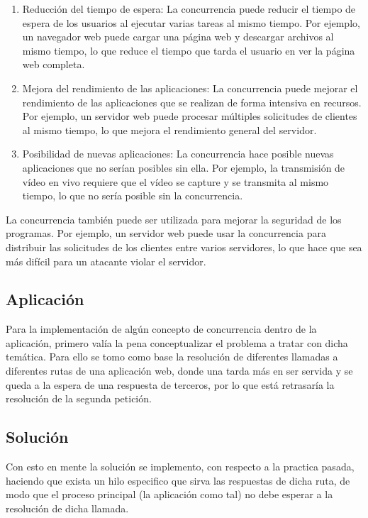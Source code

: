 \documentclass{dense_template}
\begin{document}
\begin{enumerate}
    \item Reducción del tiempo de espera: La concurrencia puede reducir el tiempo de espera de los usuarios al ejecutar varias tareas al mismo tiempo. Por ejemplo, un navegador web puede cargar una página web y descargar archivos al mismo tiempo, lo que reduce el tiempo que tarda el usuario en ver la página web completa.
    \item Mejora del rendimiento de las aplicaciones: La concurrencia puede mejorar el rendimiento de las aplicaciones que se realizan de forma intensiva en recursos. Por ejemplo, un servidor web puede procesar múltiples solicitudes de clientes al mismo tiempo, lo que mejora el rendimiento general del servidor.
    \item Posibilidad de nuevas aplicaciones: La concurrencia hace posible nuevas aplicaciones que no serían posibles sin ella. Por ejemplo, la transmisión de vídeo en vivo requiere que el vídeo se capture y se transmita al mismo tiempo, lo que no sería posible sin la concurrencia.
\end{enumerate}

La concurrencia también puede ser utilizada para mejorar la seguridad de los programas. Por ejemplo, un servidor web puede usar la concurrencia para distribuir las solicitudes de los clientes entre varios servidores, lo que hace que sea más difícil para un atacante violar el servidor.

\subsection{Aplicación}
Para la implementación de algún concepto de concurrencia dentro de la aplicación, primero valía la pena conceptualizar el problema a tratar con dicha temática. Para ello se tomo como base la resolución de diferentes llamadas a diferentes rutas de una aplicación web, donde una tarda más en ser servida y se queda a la espera de una respuesta de terceros, por lo que está retrasaría la resolución de la segunda petición.

\subsection{Solución}
Con esto en mente la solución se implemento, con respecto a la practica pasada, haciendo que exista un hilo especifico que sirva las respuestas de dicha ruta, de modo que el proceso principal (la aplicación como tal) no debe esperar a la resolución de dicha llamada.
\end{document}
